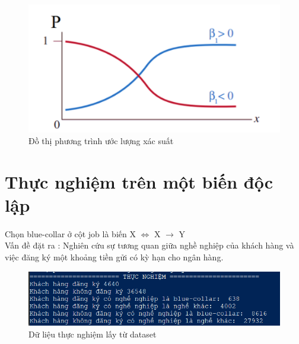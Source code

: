 \documentclass{report}
\newcommand\tab[1][1.25cm]{\hspace*{#1}}
\begin{document}
\begin{enumerate}
\begin{center}
\begin{figure}[htp]
                \begin{center}
                    \includegraphics[scale = 0.9]{image/dothiphuongtrinhuocluongxacsuat.PNG}
                \end{center}
                \caption{Đồ thị phương trình ước lượng xác suất}
            \end{figure}
        \end{center}
    \end{enumerate}
             
    \pagebreak

    \fontsize{16}{10}\selectfont
    \section{Thực nghiệm trên một biến độc lập}
    \fontsize{13}{10}\selectfont\paragraph{}
        Chọn blue-collar ở cột job là biến X $\iff$ X $\to$ Y \vspace{0.2cm}\\
        \tab[0.25cm] Vấn đề đặt ra : Nghiên cứu sự tương quan giữa nghề nghiệp của khách hàng và việc đăng ký một khoảng tiền gửi có kỳ hạn cho ngân hàng.
        
        \begin{center}
            \begin{figure}[htp]
                \begin{center}
                    \includegraphics[scale = 0.9]{image/LR_1.png}
                \end{center}
                \caption{Dữ liệu thực nghiệm lấy từ dataset}
            \end{figure}
        \end{center}
        
\end{document}
